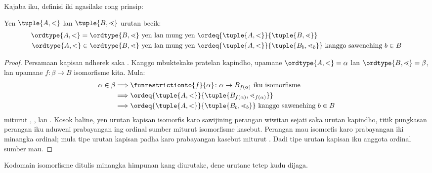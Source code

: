 \documentclass[../../../include/open-logic-section]{subfiles}
\begin{document}
Kajaba iku, definisi iki ngasilake rong prinsip:

\begin{cor}
Yen $\tuple{A, <}$ lan $\tuple{B, \lessdot}$
urutan becik:
\begin{align*}
	\ordtype{A, <} = \ordtype{B, \lessdot}&\text{ yen lan mung yen }\ordeq{\tuple{A, <}}{\tuple{B, \lessdot}}\\
	\ordtype{A, <} \in \ordtype{B, \lessdot}&\text{ yen lan mung yen }\ordeq{\tuple{A, <}}{\tuple{B_b, \lessdot_b}}\text{ kanggo sawenehing }b \in B
\end{align*}
\end{cor}

\begin{proof}
Persamaan kapisan ndherek saka
. Kanggo mbuktekake
pratelan kapindho, upamane $\ordtype{A, <} = \alpha$
lan $\ordtype{B, \lessdot} = \beta$, lan upamane
$f \colon \beta \to B$ isomorfisme kita. Mula:
\begin{align*}
	\alpha \in \beta&\Longrightarrow\funrestrictionto{f}{\alpha} \colon \alpha \to B_{f(\alpha)}\text{ iku isomorfisme}\\
	&\Longrightarrow\ordeq{\tuple{A, <}}{\tuple{B_{f(\alpha)}, \lessdot_{f(\alpha)}}}\\
	&\Longrightarrow\ordeq{\tuple{A, <}}{\tuple{B_b, \lessdot_b}}\text{ kanggo sawenehing $b \in B$}
\end{align*}
miturut ,
, lan
. Kosok baline,
yen urutan kapisan isomorfis karo sawijining perangan
wiwitan sejati saka urutan kapindho, titik pungkasan
perangan iku nduweni prabayangan ing ordinal sumber
miturut isomorfisme kasebut. Perangan mau isomorfis
karo prabayangan iki minangka ordinal; mula tipe
urutan kapisan padha karo prabayangan kasebut miturut
. Dadi tipe urutan kapisan
iku anggota ordinal sumber mau.
\end{proof}
Kodomain isomorfisme ditulis minangka himpunan kang diurutake, dene urutane tetep kudu dijaga.
\end{document}
